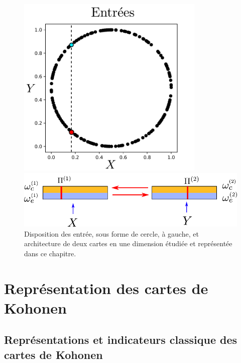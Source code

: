 \begin{figure}
\begin{minipage}{0.4\textwidth}
\centering
\includegraphics[width=0.8\textwidth]{2som_inp_noinformation}
\end{minipage}
\begin{minipage}{0.6\textwidth}
\includegraphics[width=\textwidth]{2som_archi}
\end{minipage}
\label{fig:exp}
\caption{Disposition des entrée, sous forme de cercle, à gauche, et architecture de deux cartes en une dimension étudiée et représentée dans ce chapitre.}
\end{figure}
\section{Représentation des cartes de Kohonen}

\subsection{Représentations et indicateurs classique des cartes de Kohonen}

